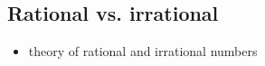 \documentclass[12pt]{article}
\theoremstyle{definition}
\begin{document}
   \subsection*{Rational vs. irrational}
\begin{itemize}

\item theory of rational and irrational numbers

\end{itemize}



\end{document}
